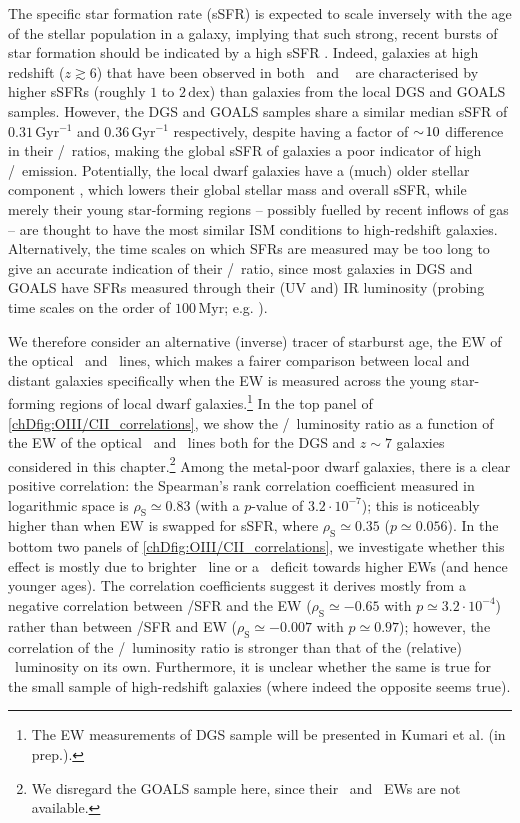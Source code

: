 The specific star formation rate (sSFR) is expected to scale inversely with the age of the stellar population in a galaxy, implying that such strong, recent bursts of star formation should be indicated by a high sSFR \citep{2021MNRAS.505.5543V}. Indeed, galaxies at high redshift ($z \gtrsim 6$) that have been observed in both \OIIILam\ and \CIILam\ \citep[see e.g.][]{2020MNRAS.499.5136C} are characterised by higher sSFRs (roughly $1$ to $2 \, \mathrm{dex}$) than galaxies from the local DGS and GOALS samples.
However, the DGS and GOALS samples share a similar median sSFR of $0.31 \, \mathrm{Gyr^{-1}}$ and $0.36 \, \mathrm{Gyr^{-1}}$ respectively, despite having a factor of $\sim \! 10$ difference in their \OIIIf/\CII\ ratios, making the global sSFR of galaxies a poor indicator of high \OIIIf/\CII\ emission. Potentially, the local dwarf galaxies have a (much) older stellar component \citep[e.g.][]{1998ARA&A..36..435M}, which lowers their global stellar mass and overall sSFR, while merely their young star-forming regions -- possibly fuelled by recent inflows of gas -- are thought to have the most similar ISM conditions to high-redshift galaxies. Alternatively, the time scales on which SFRs are measured may be too long to give an accurate indication of their \OIIIf/\CII\ ratio, since most galaxies in DGS and GOALS have SFRs measured through their (UV and) IR luminosity (probing time scales on the order of $100 \, \mathrm{Myr}$; e.g. \citealt{2012ARA&A..50..531K}).

We therefore consider an alternative (inverse) tracer of starburst age, the EW of the optical \OIIIf\ and \Hbeta\ lines, which makes a fairer comparison between local and distant galaxies specifically when the EW is measured across the young star-forming regions of local dwarf galaxies.\footnote{The EW measurements of DGS sample will be presented in Kumari et al. (in prep.).} In the top panel of \cref{chDfig:OIII/CII_correlations}, we show the \OIIIf/\CII\ luminosity ratio as a function of the EW of the optical \OIIIf\ and \Hbeta\ lines both for the DGS and $z \sim 7$ galaxies considered in this chapter.\footnote{We disregard the GOALS sample here, since their \OIIIf\ and \Hbeta\ EWs are not available.} Among the metal-poor dwarf galaxies, there is a clear positive correlation: the Spearman's rank correlation coefficient measured in logarithmic space is $\rho_\text{S} \simeq 0.83$ (with a $p$-value of $3.2 \cdot 10^{-7}$); this is noticeably higher than when EW is swapped for sSFR, where $\rho_\text{S} \simeq 0.35$ ($p \simeq 0.056$). In the bottom two panels of \cref{chDfig:OIII/CII_correlations}, we investigate whether this effect is mostly due to brighter \OIIILam\ line or a \CIILam\ deficit towards higher EWs (and hence younger ages). The correlation coefficients suggest it derives mostly from a negative correlation between \CII/SFR and the EW ($\rho_\text{S} \simeq -0.65$ with $p \simeq 3.2 \cdot 10^{-4}$) rather than between \OIIIf/SFR and EW ($\rho_\text{S} \simeq -0.007$ with $p \simeq 0.97$); however, the correlation of the \OIIIf/\CII\ luminosity ratio is stronger than that of the (relative) \CII\ luminosity on its own. Furthermore, it is unclear whether the same is true for the small sample of high-redshift galaxies (where indeed the opposite seems true).


